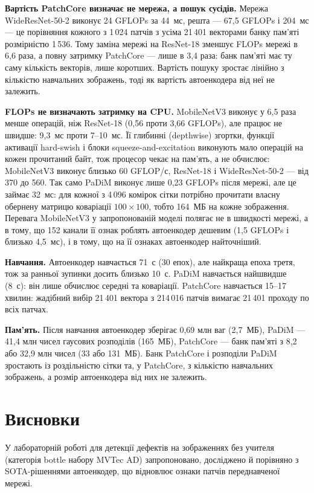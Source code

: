 \documentclass[14pt,a4paper]{extreport}
\begin{document}
\textbf{Вартість PatchCore визначає не мережа, а пошук сусідів.} Мережа WideResNet-50-2 виконує 24 GFLOPs за 44~мс, решта --- 67,5 GFLOPs і 204~мс --- це порівняння кожного з 1\,024 патчів з усіма 21\,401 векторами банку пам'яті розмірністю 1\,536. Тому заміна мережі на ResNet-18 зменшує FLOPs мережі в 6,6 раза, а повну затримку PatchCore --- лише в 3,4 раза: банк пам'яті має ту саму кількість векторів, лише коротших. Вартість пошуку зростає лінійно з кількістю навчальних зображень, тоді як вартість автоенкодера від неї не залежить.

\textbf{FLOPs не визначають затримку на CPU.} MobileNetV3 виконує у 6,5 раза менше операцій, ніж ResNet-18 (0,56 проти 3,66 GFLOPs), але працює не швидше: 9,3~мс проти 7--10~мс. Її глибинні (depthwise) згортки, функції активації hard-swish і блоки squeeze-and-excitation виконують мало операцій на кожен прочитаний байт, тож процесор чекає на пам'ять, а не обчислює: MobileNetV3 виконує близько 60 GFLOP/с, ResNet-18 і WideResNet-50-2 --- від 370 до 560. Так само PaDiM виконує лише 0,23 GFLOPs після мережі, але це займає 32~мс: для кожної з 4\,096 комірок сітки потрібно прочитати власну обернену матрицю коваріації $100 \times 100$, тобто 164~МБ на кожне зображення. Перевага MobileNetV3 у запропонованій моделі полягає не в швидкості мережі, а в тому, що 152 канали її ознак роблять автоенкодер дешевим (1,5 GFLOPs і близько 4,5~мс), і в тому, що на її ознаках автоенкодер найточніший.

\textbf{Навчання.} Автоенкодер навчається 71~с (30 епох), але найкраща епоха третя, тож за ранньої зупинки досить близько 10~с. PaDiM навчається найшвидше (8~с): він лише обчислює середні та коваріації. PatchCore навчається 15--17 хвилин: жадібний вибір 21\,401 вектора з 214\,016 патчів вимагає 21\,401 проходу по всіх патчах.

\textbf{Пам'ять.} Після навчання автоенкодер зберігає 0,69 млн ваг (2,7~МБ), PaDiM --- 41,4 млн чисел гаусових розподілів (165~МБ), PatchCore --- банк пам'яті з 8,2 або 32,9 млн чисел (33 або 131~МБ). Банк PatchCore і розподіли PaDiM зростають із роздільністю сітки та, у PatchCore, з кількістю навчальних зображень, а розмір автоенкодера від них не залежить.

\section{Висновки}

У лабораторній роботі для детекції дефектів на зображеннях без учителя (категорія bottle набору MVTec AD) запропоновано, досліджено й порівняно з SOTA-рішеннями автоенкодер, що відновлює ознаки патчів переднавченої мережі.
\end{document}
